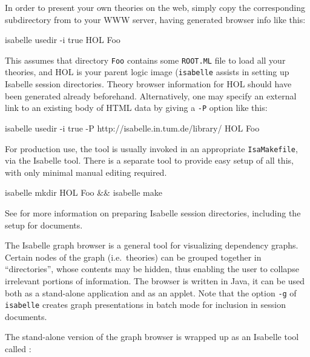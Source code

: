 \begin{isabellebody}
\begin{isamarkuptext}
  \medskip In order to present your own theories on the web, simply
  copy the corresponding subdirectory from \hyperlink{setting.ISABELLE-BROWSER-INFO}{\mbox{}} to your WWW server, having generated browser
  info like this:
\begin{ttbox}
isabelle usedir -i true HOL Foo
\end{ttbox}

  This assumes that directory \verb|Foo| contains some \verb|ROOT.ML| file to load all your theories, and HOL is your parent
  logic image (\verb|isabelle| \hyperlink{tool.mkdir}{\mbox{}} assists in
  setting up Isabelle session directories.  Theory browser information
  for HOL should have been generated already beforehand.
  Alternatively, one may specify an external link to an existing body
  of HTML data by giving \hyperlink{tool.usedir}{\mbox{}} a \verb|-P| option like
  this:
\begin{ttbox}
isabelle usedir -i true -P http://isabelle.in.tum.de/library/ HOL Foo
\end{ttbox}

  \medskip For production use, the \hyperlink{tool.usedir}{\mbox{}} tool is usually
  invoked in an appropriate \verb|IsaMakefile|, via the Isabelle
  \hyperlink{tool.make}{\mbox{}} tool.  There is a separate \hyperlink{tool.mkdir}{\mbox{}} tool to
  provide easy setup of all this, with only minimal manual editing
  required.
\begin{ttbox}
isabelle mkdir HOL Foo && isabelle make
\end{ttbox}
  See  for more information on preparing
  Isabelle session directories, including the setup for documents.%
\end{isamarkuptext}%
\isamarkuptrue%
%
\isamarkuptrue%
%
\begin{isamarkuptext}%

  The Isabelle graph browser is a general tool for visualizing
  dependency graphs.  Certain nodes of the graph (i.e.~theories) can
  be grouped together in ``directories'', whose contents may be
  hidden, thus enabling the user to collapse irrelevant portions of
  information.  The browser is written in Java, it can be used both as
  a stand-alone application and as an applet.  Note that the option
  \verb|-g| of \verb|isabelle| \hyperlink{tool.usedir}{\mbox{}} creates
  graph presentations in batch mode for inclusion in session
  documents.%
\end{isamarkuptext}%
\isamarkuptrue%
%
\isamarkuptrue%
%
\begin{isamarkuptext}%
The stand-alone version of the graph browser is wrapped up as an
  Isabelle tool called \hypertarget{tool.browser}{\hyperlink{tool.browser}{\mbox{}}}:


\end{isamarkuptext}
\end{isabellebody}
